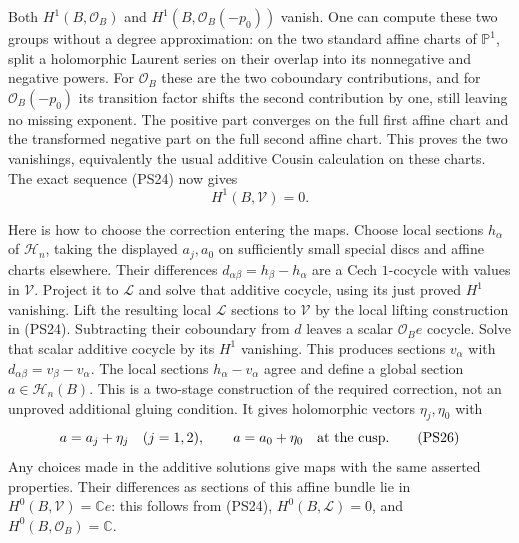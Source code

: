Both $H^1(B,\mathcal O_B)$ and
$H^1(B,\mathcal O_B(-p_0))$ vanish. One can compute these two
groups without a degree approximation: on the two standard affine
charts of $\mathbb P^1$, split a holomorphic Laurent series on
their overlap into its nonnegative and negative powers. For
$\mathcal O_B$ these are the two coboundary contributions, and
for $\mathcal O_B(-p_0)$ its transition factor shifts the second
contribution by one, still leaving no missing exponent. The positive
part converges on the full first affine chart and the transformed
negative part on the full second affine chart. This proves the two
vanishings, equivalently the usual additive Cousin calculation on
these charts. The exact sequence (PS24) now gives
\[
                             H^1(B,\mathscr V)=0.
 \tag{PS25}\label{pshift:eq:no-analytic-obstruction}
\]

Here is how to choose the correction entering the maps. Choose
local sections $h_\alpha$ of $\mathscr H_n$, taking the displayed
$a_j,a_0$ on sufficiently small special discs and affine charts
elsewhere. Their differences $d_{\alpha\beta}=h_\beta-h_\alpha$
are a Cech $1$-cocycle with values in $\mathscr V$. Project it to
$\mathcal L$ and solve that additive cocycle, using its just proved
$H^1$ vanishing. Lift the resulting local $\mathcal L$ sections to
$\mathscr V$ by the local lifting construction in (PS24). Subtracting
their coboundary from $d$ leaves a scalar $\mathcal O_Be$ cocycle.
Solve that scalar additive cocycle by its $H^1$ vanishing. This
produces sections $v_\alpha$ with
$d_{\alpha\beta}=v_\beta-v_\alpha$. The local sections
$h_\alpha-v_\alpha$ agree and define a global section
$a\in\mathscr H_n(B)$. This is a two-stage construction of the
required correction, not an unproved additional gluing condition.
It gives holomorphic vectors $\eta_j,\eta_0$ with
\[
 a=a_j+\eta_j\quad(j=1,2),\qquad a=a_0+\eta_0
                              \quad\hbox{at the cusp}.
 \tag{PS26}\label{pshift:eq:global-correction}
\]
Any choices made in the additive solutions give maps with the same
asserted properties. Their differences as sections of this affine
bundle lie in $H^0(B,\mathscr V)=\mathbb C e$: this follows from
(PS24), $H^0(B,\mathcal L)=0$, and $H^0(B,\mathcal O_B)=\mathbb C$.

